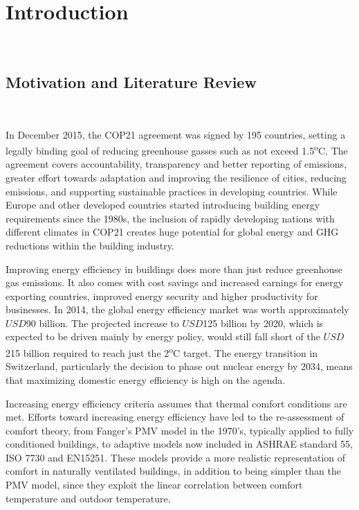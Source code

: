 
\chapter{Introduction}\
\label{ch:introduction}



\section{Motivation and Literature Review}\
\label{ch:motivation}

In December 2015, the COP21 agreement was signed by 195 countries, setting a legally binding goal of reducing greenhouse gasses such as not exceed 1.5\textsuperscript{o}C. The agreement covers accountability, transparency and better reporting of emissions, greater effort towards adaptation and improving the resilience of cities, reducing emissions, and supporting sustainable practices in developing countries. While Europe and other developed countries started introducing building energy requirements since the 1980s, the inclusion of rapidly developing nations with different climates in COP21 creates huge potential for global energy and GHG reductions within the building industry.

\item Improving energy efficiency in buildings does more than just reduce greenhouse gas emissions. It also comes with cost savings and increased earnings for energy exporting countries, improved energy security and higher productivity for businesses\cite{EIA}. In 2014, the global energy efficiency market was worth approximately $USD$90 billion. The projected increase to $USD$125 billion by 2020, which is expected to be driven mainly by energy policy, would still fall short of the $USD$215 billion required to reach just the 2\textsuperscript{o}C target\cite{EIA}. The energy transition in Switzerland, particularly the decision to phase out nuclear energy by 2034, means that maximizing domestic energy efficiency is high on the agenda.

\item Increasing energy efficiency criteria assumes that thermal comfort conditions are met. Efforts toward increasing energy efficiency have led to the re-assessment of comfort theory, from Fanger's PMV model \cite{fanger1970thermal} in the 1970's, typically applied to fully conditioned buildings, to adaptive models now included in ASHRAE standard 55, ISO 7730 and EN15251. These models provide a more realistic representation of comfort in naturally ventilated buildings, in addition to being simpler than the PMV model, since they exploit the linear correlation between comfort temperature and outdoor temperature. 

